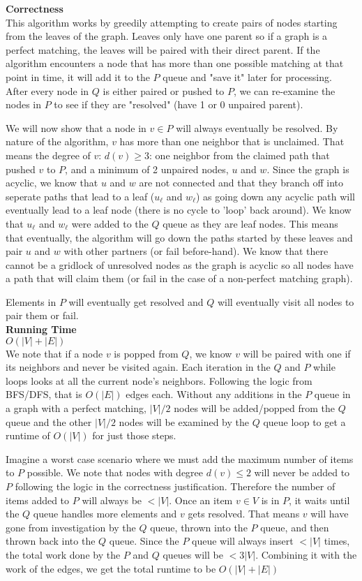 \documentclass{article}
\begin{document}
\normalsize

\textbf{Correctness}\\
This algorithm works by greedily attempting to create pairs of nodes starting from the leaves of the graph.
Leaves only have one parent so if a graph is a perfect matching, the leaves will be paired with their direct parent.
If the algorithm encounters a node that has more than one possible matching at that point in time, it will add it to the $P$ queue
and "save it" later for processing. After every node in $Q$ is either paired or pushed to $P$, we can re-examine the nodes in $P$ to see if they are "resolved" (have 1 or 0 unpaired parent).

We will now show that a node in $v \in P$ will always eventually be resolved. By nature of the algorithm, $v$ has more than one neighbor that is unclaimed.
That means the degree of $v$: $d(v) \geq 3$: one neighbor from the claimed path that pushed $v$ to $P$, and a minimum of 2 unpaired nodes, $u$ and $w$.
Since the graph is acyclic, we know that $u$ and $w$ are not connected and that they branch off into seperate paths that lead to a leaf ($u_\ell$ and $w_\ell$)
as going down any acyclic path will eventually lead to a leaf node (there is no cycle to 'loop' back around).
We know that $u_\ell$ and $w_\ell$ were added to the $Q$ queue as they are leaf nodes. This means that eventually, the algorithm will go down
the paths started by these leaves and pair $u$ and $w$ with other partners (or fail before-hand). We know that there cannot be a gridlock of unresolved
nodes as the graph is acyclic so all nodes have a path that will claim them (or fail in the case of a non-perfect matching graph). 

Elements in $P$ will eventually get resolved and $Q$ will eventually visit all nodes to pair them or fail.\\


\textbf{Running Time}\\
$O(|V| + |E|)$ \\
We note that if a node $v$ is popped from $Q$, we know $v$ will be paired with one if its neighbors and never be visited again.
Each iteration in the $Q$ and $P$ while loops looks at all the current node's neighbors. Following the logic from BFS/DFS, that is $O(|E|)$ edges each.
Without any additions in the $P$ queue in a graph with a perfect matching, $|V|/2$ nodes will be added/popped from the $Q$ queue and the other $|V|/2$ nodes will be
examined by the $Q$ queue loop to get a runtime of $O(|V|)$ for just those steps.

Imagine a worst case scenario where we must add the maximum number of items to $P$ possible. We note that nodes with degree $d(v) \leq 2$ will never 
be added to $P$ following the logic in the correctness justification. Therefore the number of items added to $P$ will always be $< |V|$.
Once an item $v \in V$ is in $P$, it waits until the $Q$ queue handles more elements and $v$ gets resolved. That means $v$ will have gone from investigation by the $Q$ queue, 
thrown into the $P$ queue, and then thrown back into the $Q$ queue. Since the $P$ queue will always insert $< |V|$ times, the total work done by the $P$ and $Q$ queues will be $< 3|V|$.
Combining it with the work of the edges, we get the total runtime to be $O(|V| + |E|)$ 
 
\end{document}
